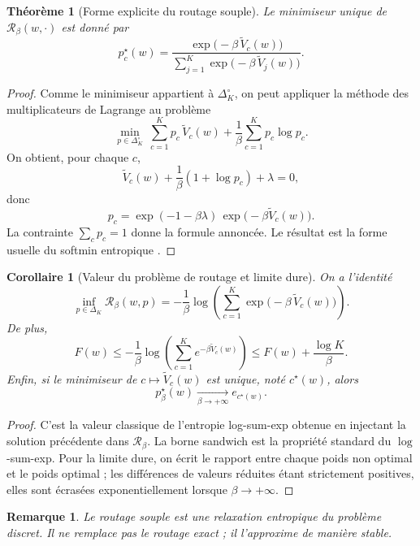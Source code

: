 \documentclass[11pt,a4paper]{article}
\newtheorem{theorem}{Théorème}[section]
\newtheorem{corollary}{Corollaire}[section]
\newtheorem{remark}{Remarque}[section]
\newcommand{\Rcal}{\mathcal R}
\begin{document}
\begin{theorem}[Forme explicite du routage souple]
Le minimiseur unique de \(\Rcal_\beta(w,\cdot)\) est donné par
\[
 p_c^\star(w)
 =
\frac{\exp\!\bigl(-\beta\,\widetilde V_c(w)\bigr)}
{\sum_{j=1}^K \exp\!\bigl(-\beta\,\widetilde V_j(w)\bigr)}.
\]
\end{theorem}

\begin{proof}
Comme le minimiseur appartient à \(\Delta_K^\circ\), on peut appliquer la méthode des multiplicateurs de Lagrange au problème
\[
\min_{p\in\Delta_K^\circ}\ \sum_{c=1}^K p_c\,\widetilde V_c(w)+\frac{1}{\beta}\sum_{c=1}^K p_c\log p_c.
\]
On obtient, pour chaque \(c\),
\[
\widetilde V_c(w)+\frac{1}{\beta}(1+\log p_c)+\lambda=0,
\]
donc
\[
 p_c=\exp(-1-\beta\lambda)\,\exp\!\bigl(-\beta\widetilde V_c(w)\bigr).
\]
La contrainte \(\sum_c p_c=1\) donne la formule annoncée. Le résultat est la forme usuelle du softmin entropique \cite{BauschkeCombettes2017,RockafellarWets1998}.
\end{proof}

\begin{corollary}[Valeur du problème de routage et limite dure]
On a l'identité
\[
\inf_{p\in\Delta_K}\Rcal_\beta(w,p)
=
-\frac{1}{\beta}\log\!\left(\sum_{c=1}^K \exp\!\bigl(-\beta\,\widetilde V_c(w)\bigr)\right).
\]
De plus,
\[
F(w)
\le
-\frac{1}{\beta}\log\!\left(\sum_{c=1}^K e^{-\beta \widetilde V_c(w)}\right)
\le
F(w)+\frac{\log K}{\beta}.
\]
Enfin, si le minimiseur de \(c\mapsto \widetilde V_c(w)\) est unique, noté \(c^\star(w)\), alors
\[
 p^\star_\beta(w)\xrightarrow[\beta\to+\infty]{} e_{c^\star(w)}.
\]
\end{corollary}

\begin{proof}
C'est la valeur classique de l'entropie log-sum-exp obtenue en injectant la solution précédente dans \(\Rcal_\beta\). La borne sandwich est la propriété standard du \(\log\)-sum-exp. Pour la limite dure, on écrit le rapport entre chaque poids non optimal et le poids optimal ; les différences de valeurs réduites étant strictement positives, elles sont écrasées exponentiellement lorsque \(\beta\to+\infty\).
\end{proof}

\begin{remark}
Le routage souple est une relaxation entropique du problème discret. Il ne remplace pas le routage exact ; il l'approxime de manière stable.
\end{remark}
\end{document}
